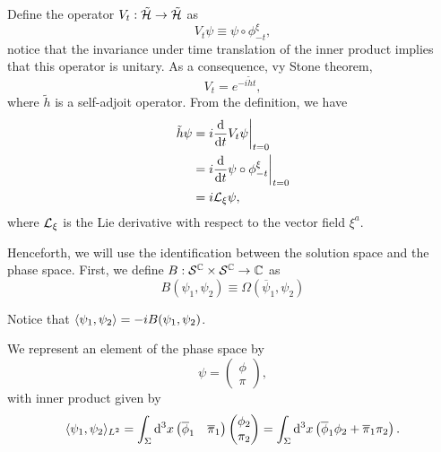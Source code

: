 Define the operator \(V_t:\tilde{{\mathcal{H}}}\to\tilde{{\mathcal{H}}}\) as
\begin{equation}
    V_t\psi\equiv\psi\circ\phi^{\xi}_{-t},
\end{equation}
notice that the invariance under time translation of the inner product implies that this operator is unitary. As a consequence, vy Stone theorem,
\begin{equation}
    V_t=e^{-i\tilde{h}t},
\end{equation}
where \(\tilde{h}\) is a self-adjoit operator. From the definition, we have
\begin{subequations}
    \begin{align}
        \tilde{h}\psi&=i\diff{}{t}V_t\psi\bigg\vert_{t=0}\\
        &=i\diff{}{t}\psi\circ\phi^{\xi}_{-t}\bigg\vert_{t=0}\\
        &=i\mathcal{L}_{\xi}\psi,
    \end{align}
\end{subequations}
where \({\mathcal{L}}_\xi\) is the Lie derivative with respect to the vector field \(\xi^a\).

Henceforth, we will use the identification between the solution space and the phase space. First, we define \(B:{\mathcal{S}}^{\mathbb{C}}\times{\mathcal{S}}^{\mathbb{C}}\to{\mathbb{C}}\) as
\begin{equation}
    B(\psi_1,\psi_2)\equiv \Omega\left(\overline{\psi}_1,\psi_2\right)
\end{equation}

\begin{remark}
    Notice that \(\left\langle \psi_1, \psi_2\right\rangle=-iB(\psi_1,\psi_2)\).
\end{remark}

We represent an element of the phase space by
\begin{equation}
    \psi=\begin{pmatrix}
        \phi\\
        \pi
    \end{pmatrix},
\end{equation}
with inner product given by
\begin{equation}
    \langle\psi_1,\psi_2\rangle_{L^2}=\int_{\Sigma}\mathrm{d}^3x
    \begin{pmatrix}
        \overline{\phi}_1&\overline{\pi}_1
    \end{pmatrix}
    \begin{pmatrix}
        \phi_2\\
        \pi_2
    \end{pmatrix}=\int_{\Sigma}\mathrm{d}^3x\left(\overline{\phi}_1\phi_2+\overline{\pi}_1\pi_2\right).
\end{equation}


